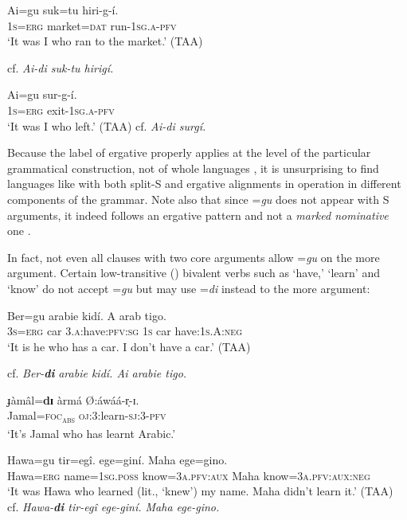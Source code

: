 \documentclass[output=paper,modfonts]{langscibook}
\begin{document}
\ea\label{ex:wolfe:2}
\gll *Ai=gu suk=tu hiri-g-í.\\
      1\textsc{s}=\textsc{erg} market=\textsc{dat} run-\textsc{1sg.a-pfv}\\
\glt ‘It was I who ran to the market.’ (TAA)
\z

cf. \textit{Ai-di suk-tu hirigí.}

\ea\label{ex:wolfe:3}
\gll *Ai=gu sur-g-í.\\
      1\textsc{s}=\textsc{erg} exit-\textsc{1sg}.\textsc{a}-\textsc{pfv}\\
\glt ‘It was I who left.’ (TAA) 
\glt cf. \textit{Ai-di surgí.}
\z

Because the label of ergative properly applies at the level of the particular grammatical construction, not of whole languages \citep[132--171]{Croft2001}, it is unsurprising to find languages like  with both split-S and ergative alignments in operation in different components of the grammar. Note also that since =\textit{gu} does not appear with S arguments, it indeed follows an ergative pattern and not a \textit{marked nominative} one \citep[138--203]{König2008}. 

In fact, not even all clauses with two core arguments allow =\textit{gu} on the more  argument. Certain low-transitive (\citealt{HopperThompson1980}) bivalent verbs such as ‘have,’ ‘learn’ and ‘know’ do not accept =\textit{gu} but may use =\textit{di} instead to  the more  argument:

\ea\label{ex:wolfe:4}
\gll *Ber=gu arabie kidí. A arab tigo.\\
     3\textsc{s}=\textsc{erg} car 3.\textsc{a}:have:\textsc{pfv}:\textsc{sg} 1\textsc{s} car have:1\textsc{s}.A:\textsc{neg}\\
\glt ‘It is he who has a car. I don’t have a car.’ (TAA) 


\glt cf. \textit{Ber-}\textbf{\textit{di}} \textit{arabie kidí. Ai arabie tigo.}
\z

\ea\label{ex:wolfe:5}
\gll ɟàmâl=\textbf{dɪ} àrmá Ø:áwáá-r̩-ɪ.\\
     Jamal=\textsc{foc}\textsc{\textsubscript{abs}}  \textsc{oj}:3:learn-\textsc{sj}:3-\textsc{pfv}\\
\glt ‘It’s Jamal who has learnt  Arabic.’ \citep[139]{Jakobi2006}
\z

\ea\label{ex:wolfe:6}
\gll *Hawa=gu tir=egî. ege=giní. Maha ege=gino.\\
     Hawa=\textsc{erg} name=\textsc{1sg}.\textsc{poss} know=3\textsc{a}.\textsc{pfv}:\textsc{aux} Maha know=3\textsc{a}.\textsc{pfv}:\textsc{aux}:\textsc{neg}\\
\glt ‘It was Hawa who learned (lit., ‘knew’) my name. Maha didn’t learn it.’ (TAA)\\
 cf. \textit{Hawa-\textbf{di}  tir-egî ege-giní. Maha ege-gino.}
\z
\end{document}
